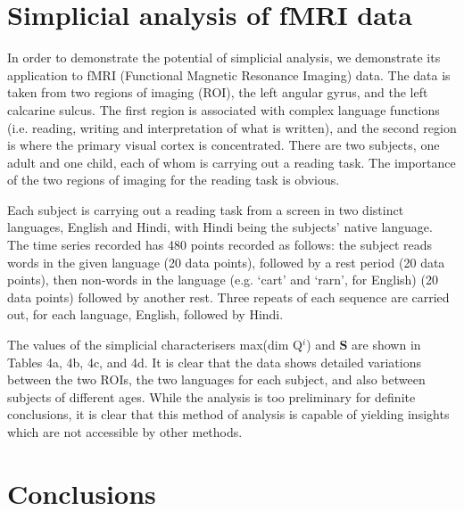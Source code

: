 \documentclass[aps,pre,superscriptaddress,groupedaddress,preprint]{revtex4}  %
\begin{document}
\section{Simplicial analysis of fMRI data}
\label{sec:3}

In order to demonstrate the potential  of  simplicial analysis, we demonstrate its application to fMRI (Functional Magnetic Resonance Imaging) data. The data is taken from two regions of imaging (ROI), the left angular gyrus, and the left calcarine sulcus. The first region is associated with complex language functions (i.e. reading, writing and interpretation of what is written), and the second region is where the primary visual cortex is concentrated. There are two subjects, one adult and one child, each of whom is carrying out a reading task. The importance of the two regions of imaging for the reading task is obvious.

Each subject is carrying out a reading task from a screen in two distinct languages, English and Hindi, with Hindi being the subjects' native language. The time series recorded has 480 points recorded  as follows: the subject reads words in the given language (20 data points), followed by a rest period (20 data points), then non-words in the language (e.g. `cart' and `rarn', for English) (20 data points) followed by another rest. Three repeats of each sequence are carried out, for each language, English, followed by Hindi.

The values of the simplicial characterisers max(dim Q$^{i}$) and $\mathbf{S}$ are shown in Tables 4a, 4b, 4c, and 4d. It is clear that the data shows detailed variations between the two ROIs, the two languages for each subject, and also between subjects of different ages. While the analysis is too preliminary for definite conclusions, it is clear that this method of analysis is capable of yielding insights which are not accessible by other methods.

% 
\section{Conclusions}
\label{sec:3}
\end{document}
